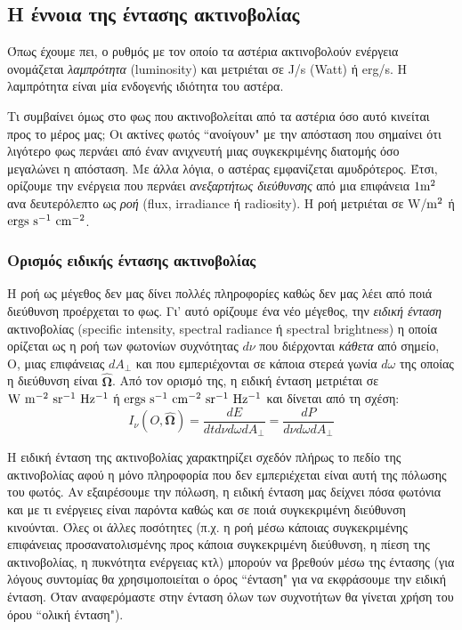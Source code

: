 \subsection{Η έννοια της έντασης ακτινοβολίας}
Όπως έχουμε πει, ο ρυθμός με τον οποίο τα αστέρια ακτινοβολούν ενέργεια ονομάζεται \textit{λαμπρότητα} (luminosity) και μετριέται σε J/s (Watt) ή erg/s. Η λαμπρότητα είναι μία ενδογενής ιδιότητα του αστέρα. 

Τι συμβαίνει όμως στο φως που ακτινοβολείται από τα αστέρια όσο αυτό κινείται προς το μέρος μας; Οι ακτίνες φωτός ``ανοίγουν" με την απόσταση που σημαίνει ότι λιγότερο φως περνάει από έναν ανιχνευτή μιας συγκεκριμένης διατομής όσο μεγαλώνει η απόσταση. Με άλλα λόγια, ο αστέρας εμφανίζεται αμυδρότερος. Έτσι, ορίζουμε την ενέργεια που περνάει \textit{\color{red} ανεξαρτήτως διεύθυνσης} από μια επιφάνεια $\rm 1 m^2$ ανα δευτερόλεπτο ως \textit{ροή} (flux, irradiance ή radiosity). Η ροή μετριέται σε W/$\rm m^2$ ή $\rm ergs \ s^{-1} \ cm^{-2}$. 



\subsubsection{Ορισμός ειδικής έντασης ακτινοβολίας}
Η ροή ως μέγεθος δεν μας δίνει πολλές πληροφορίες καθώς δεν μας λέει από ποιά διεύθυνση προέρχεται το φως. Γι' αυτό ορίζουμε ένα νέο μέγεθος, την \textit{ειδική ένταση} ακτινοβολίας (specific intensity, spectral radiance ή spectral brightness) η οποία ορίζεται ως η ροή των φωτονίων συχνότητας $d \nu$ που διέρχονται \textit{\color{red} κάθετα} από σημείο, Ο, μιας επιφάνειας $dA_{\perp}$ και που εμπεριέχονται σε κάποια στερεά γωνία $d \omega$ της οποίας η διεύθυνση είναι $\boldsymbol{\hat{\Omega}}$. Από τον ορισμό της, η ειδική ένταση μετριέται σε $\rm W \ m^{-2} \ sr^{-1} \ Hz^{-1}$ ή $\rm ergs \ s^{-1} \ cm^{-2} \ sr^{-1} \ Hz^{-1}$ και δίνεται από τη σχέση:
\begin{equation}
    I_{\nu}(O, \boldsymbol{\hat{\Omega}}) = \frac{dE}{dt d\nu d\omega dA_{\perp}} = \frac{dP}{d\nu d\omega dA_{\perp}}
\end{equation}

Η ειδική ένταση της ακτινοβολίας χαρακτηρίζει σχεδόν πλήρως το πεδίο της ακτινοβολίας αφού η μόνο πληροφορία που δεν εμπεριέχεται είναι αυτή της πόλωσης του φωτός. Αν εξαιρέσουμε την πόλωση, η ειδική ένταση μας δείχνει πόσα φωτόνια και με τι ενέργειες είναι παρόντα καθώς και σε ποιά συγκεκριμένη διεύθυνση κινούνται. Όλες οι άλλες ποσότητες (π.χ. η ροή μέσω κάποιας συγκεκριμένης επιφάνειας προσανατολισμένης προς κάποια συγκεκριμένη διεύθυνση, η πίεση της ακτινοβολίας, η πυκνότητα ενέργειας κτλ) μπορούν να βρεθούν μέσω της έντασης (για λόγους συντομίας θα χρησιμοποιείται ο όρος ``ένταση" για να εκφράσουμε την ειδική ένταση. Όταν αναφερόμαστε στην ένταση όλων των συχνοτήτων θα γίνεται χρήση του όρου ``ολική ένταση").

